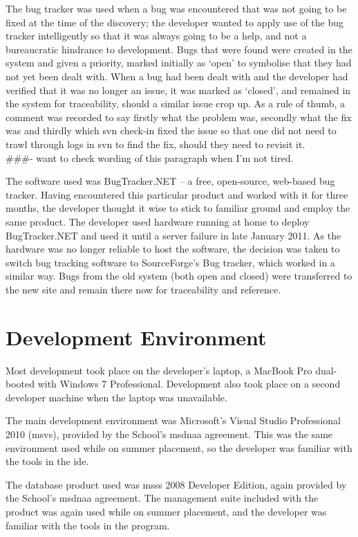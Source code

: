 \documentclass{l4proj}
\newcommand{\revisit}{\#\#\#}
\begin{document}
The bug tracker was used when a bug was encountered that was not going to be fixed at the time of the discovery; the developer wanted to apply use of the bug tracker intelligently so that it was always going to be a help, and not a bureaucratic hindrance to development.  Bugs that were found were created in the system and given a priority, marked initially as `open' to symbolise that they had not yet been dealt with.  When a bug had been dealt with and the developer had verified that it was no longer an issue, it was marked as `closed', and remained in the system for traceability, should a similar issue crop up.  As a rule of thumb, a comment was recorded to say firstly what the problem was, secondly what the fix was and thirdly which \gls{svn} check-in fixed the issue so that one did not need to trawl through logs in \gls{svn} to find the fix, should they need to revisit it.\\ \revisit - want to check wording of this paragraph when I'm not tired.

The software used was BugTracker.NET -- a free, open-source, web-based bug tracker.  Having encountered this particular product and worked with it for three months, the developer thought it wise to stick to familiar ground and employ the same product.  The developer used hardware running at home to deploy BugTracker.NET and used it until a server failure in late January 2011.  As the hardware was no longer reliable to host the software, the decision was taken to switch bug tracking software to SourceForge's Bug tracker, which worked in a similar way.  Bugs from the old system (both open and closed) were transferred to the new site and remain there now for traceability and reference. \\

\section{Development Environment}
Most development took place on the developer's laptop, a MacBook Pro dual-booted with Windows 7 Professional.  Development also took place on a second developer machine when the laptop was unavailable.

The main development environment was Microsoft's Visual Studio Professional 2010 (\gls{msvs}), provided by the School's \gls{msdnaa} agreement.  This was the same environment used while on summer placement, so the developer was familiar with the tools in the \gls{ide}.

The database product used was \gls{msss} 2008 Developer Edition, again provided by the School's \gls{msdnaa} agreement. The management suite included with the product was again used while on summer placement, and the developer was familiar with the tools in the program.
\end{document}
